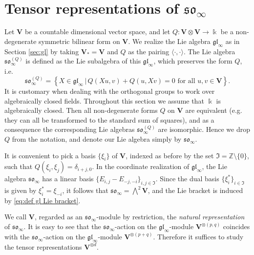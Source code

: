 \documentclass[12pt,reqno]{amsart}
\numberwithin{equation}{section}
\theoremstyle{plain}
\theoremstyle{definition}
\def\Z{\mathbb Z}
\def\gl{\mathfrak{gl}}
\def\so{\mathfrak{so}}
\def\o{\otimes}
\def\VV{\mathbf V}
\def\<{\langle}
\def\>{\rangle}
\begin{document}
\section{Tensor representations of $\so_\infty$}



Let $\VV$ be a countable dimensional vector space, and let $Q: \VV
\o \VV \to \Bbbk$ be a non-degenerate symmetric bilinear form on
$\VV$. We realize the Lie algebra $\gl_\infty$ as in Section
\ref{sec:gl} by taking $\VV_* = \VV$ and $Q$ as the pairing $\<\cdot,\cdot\>$. The Lie
algebra $\so_\infty^{(Q)}$ is defined as the Lie subalgebra of this
$\gl_\infty$, which preserves the form $Q$, i.e.
\begin{equation*}
    \so_\infty^{(Q)} = \left\{ X \in \gl_\infty \,\biggr|\, Q(X u,v) + Q(u,X v) = 0 \text{ for all } u,v \in \VV
    \right\}.
\end{equation*}
It is customary when dealing with the orthogonal groups to work over
algebraically closed fields. Throughout this section we assume
that $\Bbbk$ is algebraically closed. Then all non-degenerate forms
$Q$ on $\VV$ are equivalent (e.g. they can all be transformed to the
standard sum of squares), and as a consequence the corresponding
Lie algebras $\so_\infty^{(Q)}$ are isomorphic. Hence we drop $Q$
from the notation, and denote our Lie algebra simply by $\so_\infty$.

It is convenient to pick a basis $\{\xi_i\}$ of $\VV$, indexed as
before by the set $\mathfrak I = \Z\setminus\{0\}$, such that
$Q(\xi_i,\xi_j) = \delta_{i+j,0}$. In the coordinate realization
of $\gl_\infty$, the Lie algebra $\so_\infty$ has a linear basis
$\{E_{i,j} - E_{-j,-i}\}_{i,j\in \mathfrak I}$. Since the dual basis
$\{\xi_i^*\}_{i \in \mathfrak I}$ is given by $\xi_i^* = \xi_{-i}$,
it follows that $\so_\infty = \bigwedge^2 \VV$,
and the Lie bracket is induced by \eqref{eq:def gl Lie bracket}.

We call $\VV$, regarded as an $\so_\infty$-module by restriction,
the {\it natural representation} of $\so_\infty$.
It is easy to see that the $\so_\infty$-action on the  $\gl_\infty$-module $\VV^{\o(p,q)}$ coincides with the $\so_\infty$-action on the $\gl_\infty$-module $\VV^{\o(p+q)}$. Therefore it suffices to study the tensor representations $\VV^{\o d}$.
\end{document}
